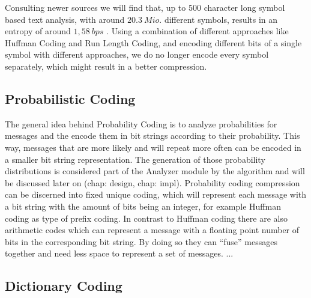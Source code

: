 \par{
Consulting newer sources we will find that, up to 500 character long symbol based text analysis, with around $20.3 \: Mio.$ different symbols, results in an entropy of around $1,58 \: bps$ \cite{entropy-new}. Using a combination of different approaches like Huffman Coding and Run Length Coding, and encoding different bits of a single symbol with different approaches, we do no longer encode every symbol separately, which might result in a better compression.}


\subsection{Probabilistic Coding}
\par{
The general idea behind Probability Coding is to analyze probabilities for messages and the encode them in bit strings according to their probability. This way, messages that are more likely and will repeat more often can be encoded in a smaller bit string representation. The generation of those probability distributions is considered part of the Analyzer module by the algorithm and will be discussed later on (chap: design, chap: impl). Probability coding compression can be discerned into fixed unique coding, which will represent each message with a bit string with the amount of bits being an integer, for example Huffman coding as type of prefix coding. In contrast to Huffman coding there are also arithmetic codes which can represent a message with a floating point number of bits in the corresponding bit string. By doing so they can \enquote{fuse} messages together and need less space to represent a set of messages.
}
...


\subsection{Dictionary Coding}

